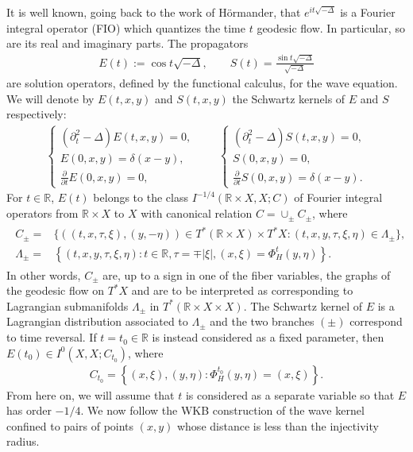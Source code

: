 \documentclass[11pt,letterpaper,oneside]{amsart}
\newcommand{\R}{\mathbb{R}}
\theoremstyle{definition}
\theoremstyle{remark}
\renewcommand{\d}{\partial}
\theoremstyle{definition}
\theoremstyle{remark}
\begin{document}
It is well known, going back to the work of H\"ormander, that $e^{i t \sqrt{- \Delta}}$ is a Fourier integral operator (FIO) which quantizes the time $t$ geodesic flow. In particular, so are its real and imaginary parts. The propagators
\begin{align}\label{propagators}
    E(t) := \cos t \sqrt{- \Delta}, \qquad S(t) = \frac{\sin t \sqrt{-\Delta}}{\sqrt{- \Delta}}
\end{align}
are solution operators, defined by the functional calculus, for the wave equation. We will denote by $E(t,x,y)$ and $S(t,x,y)$ the Schwartz kernels of $E$ and $S$ respectively:
\begin{align*}
    \begin{cases}
        (\d_t^2 - \Delta) E(t,x,y) = 0,\\
        E(0,x,y) = \delta(x-y),\\
        \frac{\d}{\d t} E(0,x,y) = 0,
    \end{cases}
    \qquad 
    \begin{cases}
        (\d_t^2 - \Delta) S(t,x,y) = 0,\\
        S(0,x,y) = 0,\\
        \frac{\d}{\d t} S(0,x,y) = \delta(x-y).
    \end{cases}
\end{align*}
For $t \in \R$, $E(t)$ belongs to the class $I^{-1/4}(\R \times X, X; C)$ of Fourier integral operators from $\R \times X$ to $X$ with canonical relation $C = \cup_\pm C_\pm$, where
\begin{align}
\label{eq:CRLagrangians}
\begin{split}
    C_\pm =& \{((t, x, \tau, \xi), (y, - \eta)) \in T^*(\R \times X) \times T^*X: (t, x,y, \tau, \xi, \eta) \in \Lambda_\pm\},\\
    \Lambda_\pm =& \left \{ (t, x, y, \tau, \xi, \eta): t \in \R, \tau = \mp |\xi|, (x,\xi) = \Phi_H^t(y,\eta) \right\}.
\end{split}
\end{align}
In other words, $C_\pm$ are, up to a sign in one of the fiber variables, the graphs of the geodesic flow on $T^* X$ and are to be interpreted as corresponding to Lagrangian submanifolds $\Lambda_\pm$ in $T^*(\R \times X \times X)$. The Schwartz kernel of $E$ is a Lagrangian distribution associated to $\Lambda_\pm$ and the two branches $(\pm)$ correspond to time reversal. If $t = t_0 \in \R$ is instead considered as a fixed parameter, then $E(t_0) \in I^{0}(X,  X; C_{t_0})$, where
\begin{align*}
    C_{t_0} = \left\{(x, \xi), (y,\eta): \Phi_H^{t_0}(y, \eta) = (x,\xi)\right\}.
\end{align*}
From here on, we will assume that $t$ is considered as a separate variable so that $E$ has order $-1/4$. We now follow the WKB construction of the wave kernel confined to pairs of points $(x,y)$ whose distance is less than the injectivity radius.
\end{document}
